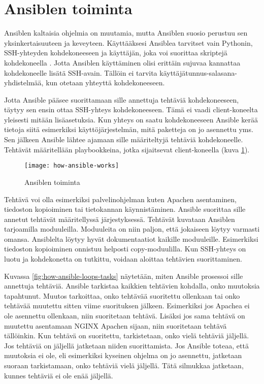\section{Ansiblen toiminta}

Ansiblen kaltaisia ohjelmia on muutamia, mutta Ansiblen suosio perustuu sen yksinkertaisuuteen ja keveyteen. Käyttääksesi Ansiblea tarvitset vain Pythonin, SSH-yhteyden kohdekoneeseen ja käyttäjän, joka voi suorittaa skriptejä kohdekoneella \cite{link:what-is-ansible}. Jotta Ansiblen käyttäminen olisi erittäin sujuvaa kannattaa kohdekoneelle lisätä SSH-avain. Tällöin ei tarvita käyttäjätunnus-salasana-yhdistelmää, kun otetaan yhteyttä kohdekoneeseen.

Jotta Ansible pääsee suorittamaan sille annettuja tehtäviä kohdekoneeseen, täytyy sen ensin ottaa SSH-yhteys kohdekoneeseen. Tämä ei vaadi client-koneelta yleisesti mitään lisäasetuksia. Kun yhteys on saatu kohdekoneeseen Ansible kerää tietoja siitä esimerkiksi käyttöjärjestelmän, mitä paketteja on jo asennettu yms. Sen jälkeen Ansible lähtee ajamaan sille määriteltyjä tehtäviä kohdekoneelle. Tehtävät määritellään playbookkeina, jotka sijaitsevat client-koneella (kuva \ref{fig:how-ansible-works}).

\begin{figure}[h]
  \texttt{[image: how-ansible-works]}
  \caption{Ansiblen toiminta}
  \label{fig:how-ansible-works}
\end{figure}

Tehtävä voi olla esimerkiksi palvelinohjelman kuten Apachen asentaminen, tiedoston kopioiminen tai tietokannan käynnistäminen. Ansible suorittaa sille annetut tehtävät määritellyssä järjestyksessä. Tehtävät kuvataan Ansiblen tarjoamilla moduuleilla. Moduuleita on niin paljon, että jokaiseen löytyy varmasti omansa. Ansiblelta löytyy hyvät dokumentaatiot kaikille moduuleille. Esimerkiksi tiedoston kopioiminen onnistuu helposti copy-moduulilla. Kun SSH-yhteys on luotu ja kohdekonetta on tutkittu, voidaan aloittaa tehtävien suorittaminen.

Kuvassa \ref{fig:how-ansible-loops-tasks} näytetään, miten Ansible prosessoi sille annettuja tehtäviä. Ansible tarkistaa kaikkien tehtävien kohdalla, onko muutoksia tapahtunut. Muutos tarkoittaa, onko tehtävää suoritettu ollenkaan tai onko tehtävää muutettu sitten viime suorituksen jälkeen. Esimerkiksi jos Apachea ei ole asennettu ollenkaan, niin suoritetaan tehtävä. Lisäksi jos sama tehtävä on muutettu asentamaan NGINX Apachen sijaan, niin suoritetaan tehtävä tällöinkin. Kun tehtävä on suoritettu, tarkistetaan, onko vielä tehtäviä jäljellä. Jos tehtäviä on jäljellä jatketaan niiden suorittamista. Jos Ansible toteaa, että muutoksia ei ole, eli esimerkiksi kyseinen ohjelma on jo asennettu, jatketaan suoraan tarkistamaan, onko tehtäviä vielä jäljellä. Tätä silmukkaa jatketaan, kunnes tehtäviä ei ole enää jäljellä.

